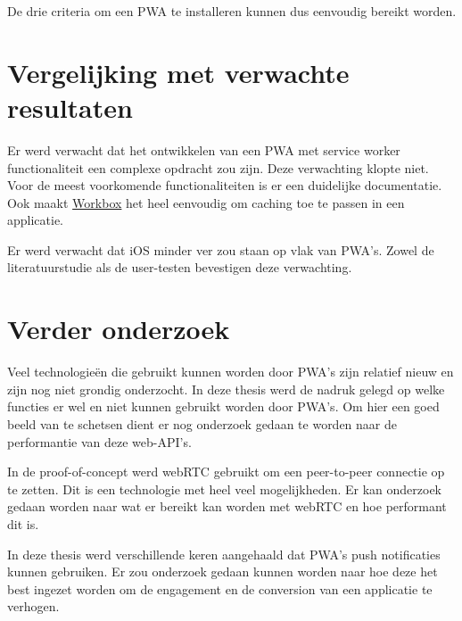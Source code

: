 		De drie criteria om een PWA te installeren kunnen dus eenvoudig bereikt worden.
		
	
	
\section{Vergelijking met verwachte resultaten}
	Er werd verwacht dat het ontwikkelen van een PWA met service worker functionaliteit een complexe opdracht zou zijn.
	Deze verwachting klopte niet. Voor de meest voorkomende functionaliteiten is er een duidelijke documentatie. Ook maakt \href{https://developers.google.com/web/tools/workbox}{Workbox} het heel eenvoudig om caching toe te passen in een applicatie.
	
	Er werd verwacht dat iOS minder ver zou staan op vlak van PWA's. Zowel de literatuurstudie als de user-testen bevestigen deze verwachting.
	

\section{Verder onderzoek}
	Veel technologieën die gebruikt kunnen worden door PWA's zijn relatief nieuw en zijn nog niet grondig onderzocht.
	In deze thesis werd de nadruk gelegd op welke functies er wel en niet kunnen gebruikt worden door PWA's. Om hier een goed beeld van te schetsen dient er nog onderzoek gedaan te worden naar de performantie van deze web-API's.
	
	In de proof-of-concept werd webRTC gebruikt om een peer-to-peer connectie op te zetten. Dit is een technologie met heel veel mogelijkheden. Er kan onderzoek gedaan worden naar wat er bereikt kan worden met webRTC en hoe performant dit is.
	
	In deze thesis werd verschillende keren aangehaald dat PWA's push notificaties kunnen gebruiken. Er zou onderzoek gedaan kunnen worden naar hoe deze het best ingezet worden om de engagement en de conversion van een applicatie te verhogen.